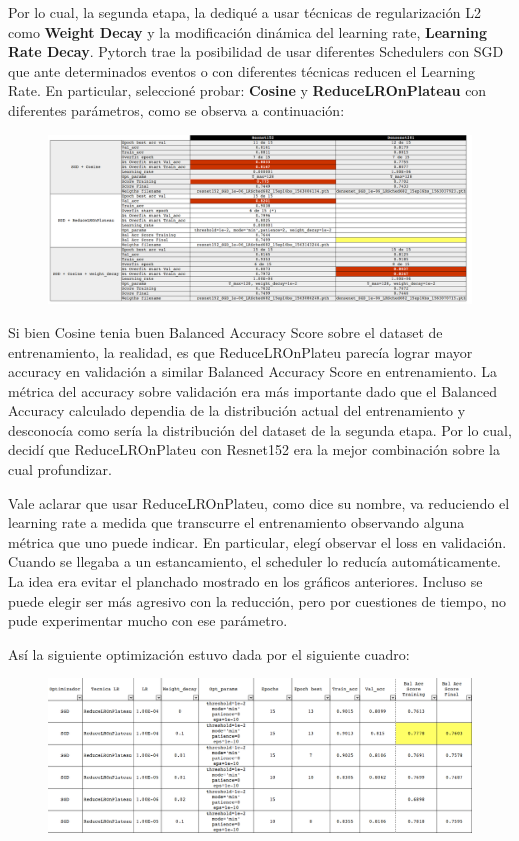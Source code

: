 \documentclass{article}[9pt]
\begin{document}
Por lo cual, la segunda etapa, la dediqué a usar técnicas de regularización L2 como \textbf{Weight Decay} y la modificación dinámica del learning rate, \textbf{Learning Rate Decay}. Pytorch trae la posibilidad de usar diferentes Schedulers con SGD que ante determinados eventos o con diferentes técnicas reducen el Learning Rate. En particular, seleccioné probar: \textbf{Cosine} y \textbf{ReduceLROnPlateau} con diferentes parámetros, como se observa a continuación:

\begin{figure}[H]
    \includegraphics[width=\linewidth]{img/optim1.png}
\end{figure}

Si bien Cosine tenia buen Balanced Accuracy Score sobre el dataset de entrenamiento, la realidad, es que ReduceLROnPlateu parecía lograr mayor accuracy en validación a similar Balanced Accuracy Score en entrenamiento. La métrica del accuracy sobre validación era más importante dado que el Balanced Accuracy calculado dependia de la distribución actual del entrenamiento y desconocía como sería la distribución del dataset de la segunda etapa. Por lo cual, decidí que ReduceLROnPlateu con Resnet152 era la mejor combinación sobre la cual profundizar.

Vale aclarar que usar ReduceLROnPlateu, como dice su nombre, va reduciendo el learning rate a medida que transcurre el entrenamiento observando alguna métrica que uno puede indicar. En particular, elegí observar el loss en validación. Cuando se llegaba a un estancamiento, el scheduler lo reducía automáticamente. La idea era evitar el planchado mostrado en los gráficos anteriores. Incluso se puede elegir ser más agresivo con la reducción, pero por cuestiones de tiempo, no pude experimentar mucho con ese parámetro.

Así la siguiente optimización estuvo dada por el siguiente cuadro:

\begin{figure}[H]
    \includegraphics[width=\linewidth]{img/optim2.png}
\end{figure}
\end{document}
